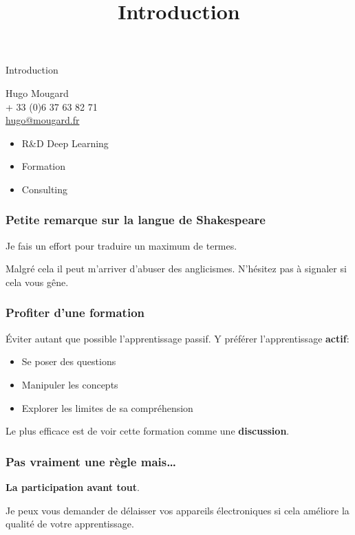 \documentclass{formation}
\title{Introduction}
\begin{document}
\maketitle

\begin{frame}{Introduction}
  \begin{multicols}{2}
    Hugo Mougard\\
    + 33 (0)6 37 63 82 71\\
    \href{mailto:hugo@mougard.fr}{\url{hugo@mougard.fr}}\\

    \columnbreak

    \begin{itemize}
    \item R\&D Deep Learning
    \item Formation
    \item Consulting
    \end{itemize}
  \end{multicols}
\end{frame}

\begin{frame}
  \frametitle{Petite remarque sur la langue de Shakespeare}
  Je fais un effort pour traduire un maximum de termes.

  Malgré cela il peut m'arriver d'abuser des anglicismes. N'hésitez
  pas à signaler si cela vous gêne.
\end{frame}

\begin{frame}
  \frametitle{Profiter d'une formation}
  Éviter autant que possible l'apprentissage passif. Y préférer
  l'apprentissage \textbf{actif}:
  \begin{itemize}
  \item Se poser des questions
  \item Manipuler les concepts
  \item Explorer les limites de sa compréhension
  \end{itemize}
  Le plus efficace est de voir cette formation comme une
  \textbf{discussion}.
\end{frame}

\begin{frame}
  \frametitle{Pas vraiment une règle mais…}
  \textbf{La participation avant tout}.

  Je peux vous demander de délaisser vos appareils électroniques si
  cela améliore la qualité de votre apprentissage.
\end{frame}
\end{document}
